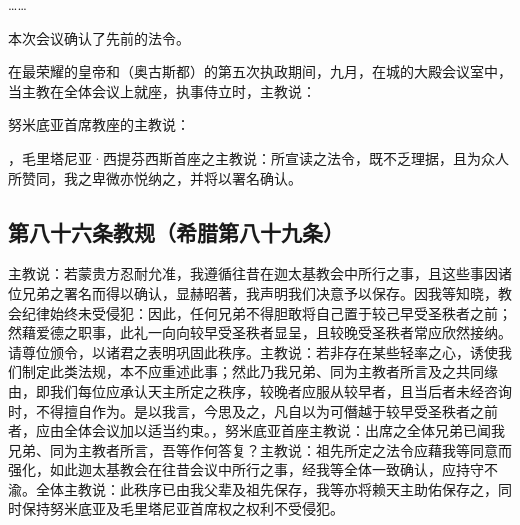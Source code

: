 ……\par

本次会议确认了先前的法令。\par

在最荣耀的皇帝和（奥古斯都）的第五次执政期间，九月，在城的大殿会议室中，当主教在全体会议上就座，执事侍立时，主教说：\par

努米底亚首席教座的主教说：\par

，毛里塔尼亚·西提芬西斯首座之主教说：所宣读之法令，既不乏理据，且为众人所赞同，我之卑微亦悦纳之，并将以署名确认。\par


\subsection{第八十六条教规（希腊第八十九条）}

\par

主教说：若蒙贵方忍耐允准，我遵循往昔在迦太基教会中所行之事，且这些事因诸位兄弟之署名而得以确认，显赫昭著，我声明我们决意予以保存。因我等知晓，教会纪律始终未受侵犯：因此，任何兄弟不得胆敢将自己置于较己早受圣秩者之前；然藉爱德之职事，此礼一向向较早受圣秩者显呈，且较晚受圣秩者常应欣然接纳。请尊位颁令，以诸君之表明巩固此秩序。主教说：若非存在某些轻率之心，诱使我们制定此类法规，本不应重述此事；然此乃我兄弟、同为主教者所言及之共同缘由，即我们每位应承认天主所定之秩序，较晚者应服从较早者，且当后者未经咨询时，不得擅自作为。是以我言，今思及之，凡自以为可僭越于较早受圣秩者之前者，应由全体会议加以适当约束。，努米底亚首座主教说：出席之全体兄弟已闻我兄弟、同为主教者所言，吾等作何答复？主教说：祖先所定之法令应藉我等同意而强化，如此迦太基教会在往昔会议中所行之事，经我等全体一致确认，应持守不渝。全体主教说：此秩序已由我父辈及祖先保存，我等亦将赖天主助佑保存之，同时保持努米底亚及毛里塔尼亚首席权之权利不受侵犯。\par

